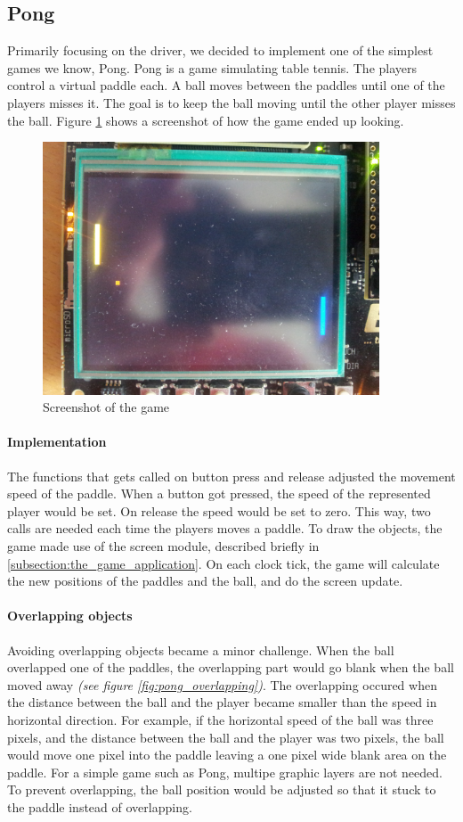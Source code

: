 \subsection{Pong}
\label{subsection:pong}
Primarily focusing on the driver, we decided to implement one of the simplest games we know, Pong. Pong is a game simulating table tennis. The players control a virtual paddle each. A ball moves between the paddles until one of the players misses it. The goal is to keep the ball moving until the other player misses the ball. Figure \ref{fig:pong_screenshot} shows a screenshot of how the game ended up looking.

\begin{figure}[h]
	\label{fig:pong_screenshot}
	\centering
	\includegraphics[width=10cm]{img/pong_screen.jpg}
	\caption{Screenshot of the game}
\end{figure}

\paragraph{Implementation} The functions that gets called on button press and release adjusted the movement speed of the paddle. When a button got pressed, the speed of the represented player would be set. On release the speed would be set to zero. This way, two calls are needed each time the players moves a paddle. To draw the objects, the game made use of the screen module, described briefly in \ref{subsection:the_game_application}. On each clock tick, the game will calculate the new positions of the paddles and the ball, and do the screen update.

\paragraph{Overlapping objects} 
Avoiding overlapping objects became a minor challenge. When the ball overlapped one of the paddles, the overlapping part would go blank when the ball moved away \emph{(see figure \ref{fig:pong_overlapping})}.
The overlapping occured when the distance between the ball and the player became smaller than the speed in horizontal direction. For example, if the horizontal speed of the ball was three pixels, and the distance between the ball and the player was two pixels, the ball would move one pixel into the paddle leaving a one pixel wide blank area on the paddle. For a simple game such as Pong, multipe graphic layers are not needed. To prevent overlapping, the ball position would be adjusted so that it stuck to the paddle instead of overlapping. 

